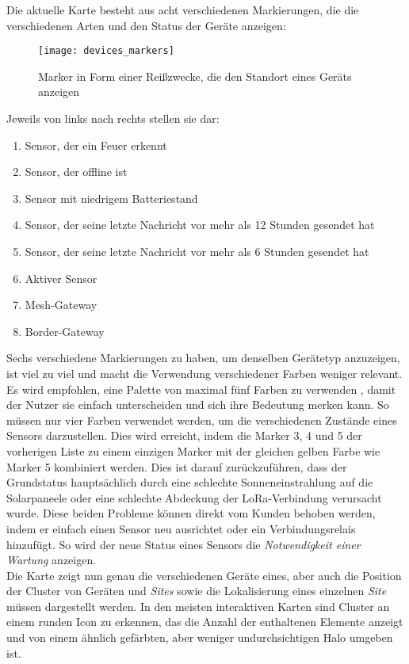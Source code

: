 Die aktuelle Karte besteht aus acht verschiedenen Markierungen, die die verschiedenen Arten und den Status der Geräte anzeigen:

\begin{figure}[H]
  \centering
  \texttt{[image: devices\_markers]}
  \caption{Marker in Form einer Reißzwecke, die den Standort eines Geräts anzeigen}
  \label{fig:devices_markers}
\end{figure}

Jeweils von links nach rechts stellen sie dar:

\begin{enumerate}
  \item Sensor, der ein Feuer erkennt
  \item Sensor, der offline ist
  \item Sensor mit niedrigem Batteriestand
  \item Sensor, der seine letzte Nachricht vor mehr als 12 Stunden gesendet hat
  \item Sensor, der seine letzte Nachricht vor mehr als 6 Stunden gesendet hat
  \item Aktiver Sensor
  \item Mesh-Gateway
  \item Border-Gateway
\end{enumerate}

Sechs verschiedene Markierungen zu haben, um denselben Gerätetyp anzuzeigen, ist viel zu viel und macht die Verwendung verschiedener Farben weniger relevant.
Es wird empfohlen, eine Palette von maximal fünf Farben zu verwenden \cite{likeChameleon}, damit der Nutzer sie einfach unterscheiden und sich ihre Bedeutung merken kann.
So müssen nur vier Farben verwendet werden, um die verschiedenen Zustände eines Sensors darzustellen.
Dies wird erreicht, indem die Marker 3, 4 und 5 der vorherigen  Liste zu einem einzigen Marker mit der gleichen gelben Farbe wie Marker 5 kombiniert werden.
Dies ist darauf zurückzuführen, dass der Grundstatus hauptsächlich durch eine schlechte Sonneneinstrahlung auf die Solarpaneele oder eine schlechte Abdeckung der LoRa-Verbindung verursacht wurde.
Diese beiden Probleme können direkt vom Kunden behoben werden, indem er einfach einen Sensor neu ausrichtet oder ein Verbindungsrelais hinzufügt.
So wird der neue Status eines Sensors die \textit{Notwendigkeit einer Wartung} anzeigen.\\

Die Karte zeigt nun genau die verschiedenen Geräte eines, aber auch die Position der Cluster von Geräten und \textit{Sites} sowie die Lokalisierung eines einzelnen \textit{Site} müssen dargestellt werden.
In den meisten interaktiven Karten sind Cluster an einem runden Icon zu erkennen, das die Anzahl der enthaltenen Elemente anzeigt und von einem ähnlich gefärbten, aber weniger undurchsichtigen Halo umgeben ist.

